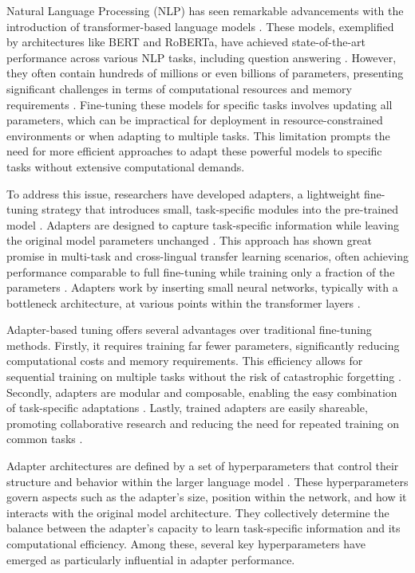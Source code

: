 \documentclass[conference]{IEEEtran}
\begin{document}
Natural Language Processing (NLP) has seen remarkable advancements with the introduction of transformer-based language models \cite{b1} \cite{b2}. These models, exemplified by architectures like BERT and RoBERTa, have achieved state-of-the-art performance across various NLP tasks, including question answering \cite{b3,b4}. However, they often contain hundreds of millions or even billions of parameters, presenting significant challenges in terms of computational resources and memory requirements \cite{b5}. Fine-tuning these models for specific tasks involves updating all parameters, which can be impractical for deployment in resource-constrained environments or when adapting to multiple tasks. This limitation prompts the need for more efficient approaches to adapt these powerful models to specific tasks without extensive computational demands.

To address this issue, researchers have developed adapters, a lightweight fine-tuning strategy that introduces small, task-specific modules into the pre-trained model \cite{b6}. Adapters are designed to capture task-specific information while leaving the original model parameters unchanged \cite{b6,b7}. This approach has shown great promise in multi-task and cross-lingual transfer learning scenarios, often achieving performance comparable to full fine-tuning while training only a fraction of the parameters \cite{b3,b7}. Adapters work by inserting small neural networks, typically with a bottleneck architecture, at various points within the transformer layers \cite{b7}.

Adapter-based tuning offers several advantages over traditional fine-tuning methods. Firstly, it requires training far fewer parameters, significantly reducing computational costs and memory requirements\cite{b3,b8}. This efficiency allows for sequential training on multiple tasks without the risk of catastrophic forgetting \cite{b8}. Secondly, adapters are modular and composable, enabling the easy combination of task-specific adaptations \cite{b7,b8}. Lastly, trained adapters are easily shareable, promoting collaborative research and reducing the need for repeated training on common tasks \cite{b7}.

Adapter architectures are defined by a set of hyperparameters that control their structure and behavior within the larger language model\cite{b9,b10} . These hyperparameters govern aspects such as the adapter's size, position within the network, and how it interacts with the original model architecture. They collectively determine the balance between the adapter's capacity to learn task-specific information and its computational efficiency. Among these, several key hyperparameters have emerged as particularly influential in adapter performance.
\end{document}
